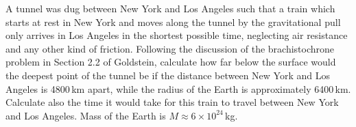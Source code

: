\documentclass[12pt]{article}
\begin{document}
\begin{problem}{1}
\begin{solution}
\end{solution}
    
\end{problem}

\begin{problem}{2}
A tunnel was dug between New York and Los Angeles such that a train which 
starts at rest in New York and moves along the tunnel by the gravitational pull 
only arrives in Los Angeles in the shortest possible time, neglecting air 
resistance and any other kind of friction. Following the discussion of the 
brachistochrone problem in Section 2.2 of Goldstein, calculate how far below 
the surface would the deepest point of the tunnel be if the distance between 
New York and Los Angeles is 4800\,\si{km} apart, while the radius of the Earth 
is approximately 6400\,\si{km}. Calculate also the time it would take for this 
train to travel between New York and Los Angeles. Mass of the Earth is 
$M\approx 6\times10^{24}$\,\si{kg}. 


\end{problem}
\end{document}
